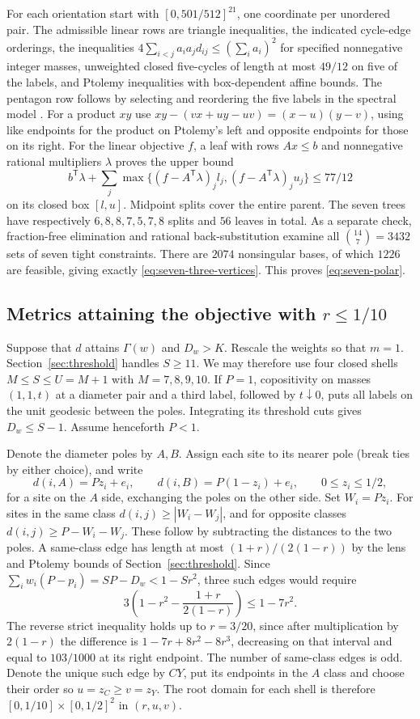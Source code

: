 \documentclass[11pt,a4paper]{article}
\theoremstyle{definition}
\begin{document}
For each orientation start with $[0,501/512]^{21}$, one coordinate per
unordered pair. The admissible linear rows are triangle inequalities, the
indicated cycle-edge orderings, the inequalities
$4\sum_{i<j}a_i a_jd_{ij}\le(\sum_i a_i)^2$ for specified nonnegative
integer masses, unweighted closed five-cycles of length at most $49/12$
on five of the labels, and Ptolemy inequalities with box-dependent affine
bounds. The pentagon row follows by selecting and reordering the five
labels in the spectral model \cite{Zhou,Jiang}. For a product $xy$ use
$xy-(vx+uy-uv)=(x-u)(y-v)$, using like endpoints for the product on
Ptolemy's left and opposite endpoints for those on its right. For the
linear objective $f$, a leaf with rows $Ax\le b$ and nonnegative rational
multipliers $\lambda$ proves the upper bound
\[
   b^{\mathsf T}\lambda+
   \sum_j\max\{(f-A^{\mathsf T}\lambda)_j l_j,
                (f-A^{\mathsf T}\lambda)_j u_j\}\le77/12
\]
on its closed box $[l,u]$. Midpoint splits cover the entire parent.
The seven trees have respectively $6,8,8,7,5,7,8$ splits and $56$ leaves
in total. As a separate check, fraction-free elimination and rational back-substitution
examine all $\binom{14}{7}=3432$ sets of seven tight constraints. There are $2074$ nonsingular bases, of which $1226$
are feasible, giving exactly \eqref{eq:seven-three-vertices}.
This proves \eqref{eq:seven-polar}.

\subsection{Metrics attaining the objective with $r\le1/10$}
Suppose that $d$ attains $\Gamma(w)$ and $D_w>K$. Rescale the weights so
that $m=1$. Section~\ref{sec:threshold} handles $S\ge11$. We may therefore
use four closed shells $M\le S\le U=M+1$ with $M=7,8,9,10$. If $P=1$,
copositivity on masses $(1,1,t)$ at a diameter pair and a third label,
followed by $t\downarrow0$, puts all labels on the unit geodesic between
the poles. Integrating its threshold cuts gives $D_w\le S-1$.
Assume henceforth $P<1$.

Denote the diameter poles by $A,B$. Assign each site to its nearer pole
(break ties by either choice), and write
\[
 d(i,A)=Pz_i+e_i,\qquad d(i,B)=P(1-z_i)+e_i,\qquad 0\le z_i\le1/2,
\]
for a site on the $A$ side, exchanging the poles on the other side.
Set $W_i=Pz_i$. For sites in the same class $d(i,j)\ge|W_i-W_j|$,
and for opposite classes $d(i,j)\ge P-W_i-W_j$. These follow by
subtracting the distances to the two poles. A same-class edge has length
at most $(1+r)/(2(1-r))$ by the lens and Ptolemy bounds of
Section~\ref{sec:threshold}. Since
$\sum_i w_i(P-p_i)=SP-D_w<1-Sr^2$, three such edges would require
\[
 3\left(1-r^2-\frac{1+r}{2(1-r)}\right)\le1-7r^2.
\]
The reverse strict inequality holds up to $r=3/20$, since after multiplication
by $2(1-r)$ the difference is $1-7r+8r^2-8r^3$, decreasing on that interval
and equal to $103/1000$ at its right endpoint. The number of same-class
edges is odd. Denote the unique such edge by $CY$, put its endpoints in
the $A$ class and choose their order so $u=z_C\ge v=z_Y$. The root domain
for each shell is therefore $[0,1/10]\times[0,1/2]^2$ in $(r,u,v)$.
\end{document}
